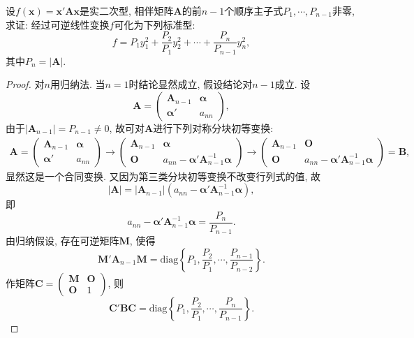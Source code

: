 \documentclass[../../main.tex]{subfiles}
\begin{document}
\begin{proposition}\label{proposition:利用顺序主子式计算二次型的标准型}
设$f(\boldsymbol{x}) = \boldsymbol{x}'\boldsymbol{A}\boldsymbol{x}$是实二次型, 相伴矩阵$\boldsymbol{A}$的前$n - 1$个顺序主子式$P_1, \cdots, P_{n - 1}$非零, 求证: 经过可逆线性变换$f$可化为下列标准型:
\[
f = P_1y_1^2 + \frac{P_2}{P_1}y_2^2 + \cdots + \frac{P_n}{P_{n - 1}}y_n^2,
\]
其中$P_n = |\boldsymbol{A}|$.
\end{proposition}
\begin{proof}
对$n$用归纳法. 当$n = 1$时结论显然成立, 假设结论对$n - 1$成立. 设
\[
\boldsymbol{A}=\begin{pmatrix}
\boldsymbol{A}_{n - 1} & \boldsymbol{\alpha} \\
\boldsymbol{\alpha}' & a_{nn}
\end{pmatrix},
\]
由于$|\boldsymbol{A}_{n - 1}| = P_{n - 1}\neq 0$, 故可对$\boldsymbol{A}$进行下列对称分块初等变换:
\begin{align*}
\boldsymbol{A}=\begin{pmatrix}
\boldsymbol{A}_{n - 1} & \boldsymbol{\alpha} \\
\boldsymbol{\alpha}' & a_{nn}
\end{pmatrix}
\rightarrow
\begin{pmatrix}
\boldsymbol{A}_{n - 1} & \boldsymbol{\alpha} \\
\boldsymbol{O} & a_{nn}-\boldsymbol{\alpha}'\boldsymbol{A}_{n - 1}^{-1}\boldsymbol{\alpha}
\end{pmatrix}
\rightarrow
\begin{pmatrix}
\boldsymbol{A}_{n - 1} & \boldsymbol{O} \\
\boldsymbol{O} & a_{nn}-\boldsymbol{\alpha}'\boldsymbol{A}_{n - 1}^{-1}\boldsymbol{\alpha}
\end{pmatrix}
=\boldsymbol{B},
\end{align*}
显然这是一个合同变换. 又因为第三类分块初等变换不改变行列式的值, 故
\[
|\boldsymbol{A}| = |\boldsymbol{A}_{n - 1}|(a_{nn}-\boldsymbol{\alpha}'\boldsymbol{A}_{n - 1}^{-1}\boldsymbol{\alpha}),
\]
即
\[
a_{nn}-\boldsymbol{\alpha}'\boldsymbol{A}_{n - 1}^{-1}\boldsymbol{\alpha}=\frac{P_n}{P_{n - 1}}.
\]
由归纳假设, 存在可逆矩阵$\boldsymbol{M}$, 使得
\[
\boldsymbol{M}'\boldsymbol{A}_{n - 1}\boldsymbol{M}=\text{diag}\left\{P_1, \frac{P_2}{P_1}, \cdots, \frac{P_{n - 1}}{P_{n - 2}}\right\}.
\]
作矩阵$\boldsymbol{C}=\begin{pmatrix}
\boldsymbol{M} & \boldsymbol{O} \\
\boldsymbol{O} & 1
\end{pmatrix}$, 则
\[
\boldsymbol{C}'\boldsymbol{B}\boldsymbol{C}=\text{diag}\left\{P_1, \frac{P_2}{P_1}, \cdots, \frac{P_n}{P_{n - 1}}\right\}. 
\] 
\end{proof}
\end{document}
